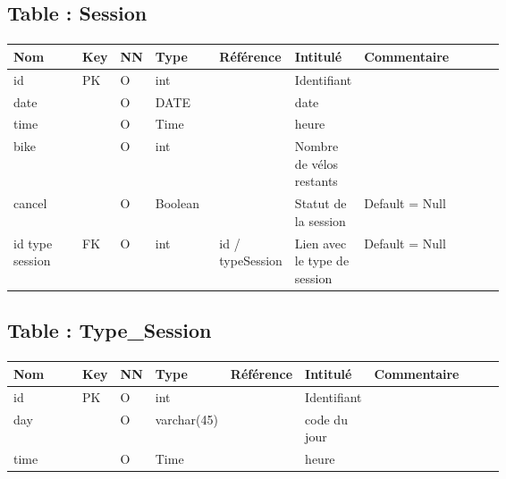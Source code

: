 	
	\subsection{Table : Session}
		\paragraph{}
			\begin{tabularx}{\linewidth}{|T{0.14\linewidth}|T{0.05\linewidth}|T{0.05\linewidth}|T{0.13\linewidth}|T{0.14\linewidth}|T{0.13\linewidth}|Y|}
				\hline
				Nom & Key & NN & Type & Référence & Intitulé & Commentaire \\
				\hline
				id & PK & O & int & & Identifiant & \\
				\hline
				date & & O & DATE & & date & \\
				\hline
				time & & O & Time & & heure & \\
				\hline
				bike & & O & int & & Nombre de vélos restants & \\
				\hline
				cancel & & O & Boolean & & Statut de la session & Default = Null\\
				\hline
				id type session & FK & O & int & id / typeSession & Lien avec le type de session & Default = Null\\
				\hline
			\end{tabularx}
			
			
	\vspace{\baselineskip}
	\subsection{Table : Type\_Session}
		\paragraph{}
			\begin{tabularx}{\linewidth}{|T{0.14\linewidth}|T{0.05\linewidth}|T{0.05\linewidth}|T{0.13\linewidth}|T{0.14\linewidth}|T{0.13\linewidth}|Y|}
				\hline
				Nom & Key & NN & Type & Référence & Intitulé & Commentaire \\
				\hline
				id & PK & O & int & & Identifiant & \\
				\hline
				day & & O & varchar(45) & & code du jour & \\
				\hline
				time & & O & Time & & heure & \\
				\hline
			\end{tabularx}
			
			
	\vspace{\baselineskip}
